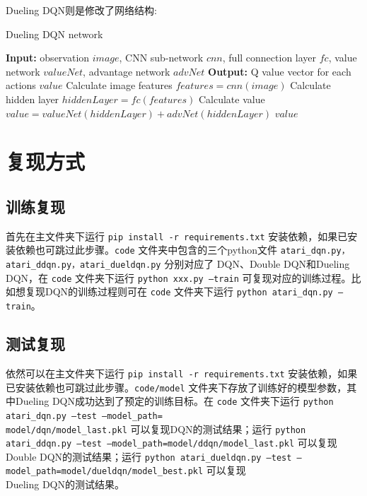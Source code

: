 \documentclass[a4paper,12pt]{article}
\begin{document}
\begin{CJK}{UTF8}{gbsn}
\newpage
\noindent Dueling DQN则是修改了网络结构:
\begin{algorithm}[!h]
	\caption{Dueling DQN network}
	\begin{algorithmic}[1]
		\STATE \textbf{Input:} observation $image$, CNN sub-network $cnn$, full connection layer  $fc$, value network $valueNet$, advantage network $advNet$
		\STATE \textbf{Output:} Q value vector for each actions $value$
		\STATE Calculate image features $features=cnn(image)$
		\STATE Calculate hidden layer $hiddenLayer=fc(features)$
		\STATE Calculate value $value=valueNet(hiddenLayer)+advNet(hiddenLayer)$
		\RETURN $value$
	\end{algorithmic}
\end{algorithm}
\section{复现方式}
\subsection{训练复现}
\noindent 首先在主文件夹下运行 \texttt{pip install -r requirements.txt} 安装依赖，如果已安装依赖也可跳过此步骤。\texttt{code} 文件夹中包含的三个python文件 \texttt{atari\_dqn.py，atari\_ddqn.py，atari\_dueldqn.py} 分别对应了 DQN、Double DQN和Dueling DQN，在 \texttt{code} 文件夹下运行 \texttt{python xxx.py --train} 可复现对应的训练过程。比如想复现DQN的训练过程则可在 \texttt{code} 文件夹下运行 \texttt{python atari\_dqn.py --train}。
\subsection{测试复现}
\noindent 依然可以在主文件夹下运行 \texttt{pip install -r requirements.txt} 安装依赖，如果已安装依赖也可跳过此步骤。\texttt{code/model} 文件夹下存放了训练好的模型参数，其中Dueling DQN成功达到了预定的训练目标。在 \texttt{code} 文件夹下运行 \texttt{python atari\_dqn.py --test --model\_path=\\model/dqn/model\_last.pkl} 可以复现DQN的测试结果；运行 \texttt{python atari\_ddqn.py --test --model\_path=model/ddqn/model\_last.pkl} 可以复现Double DQN的测试结果；运行 \texttt{python atari\_dueldqn.py --test --model\_path=model/dueldqn/model\_best.pkl} 可以复现\\Dueling DQN的测试结果。

\end{CJK}
\end{document}
